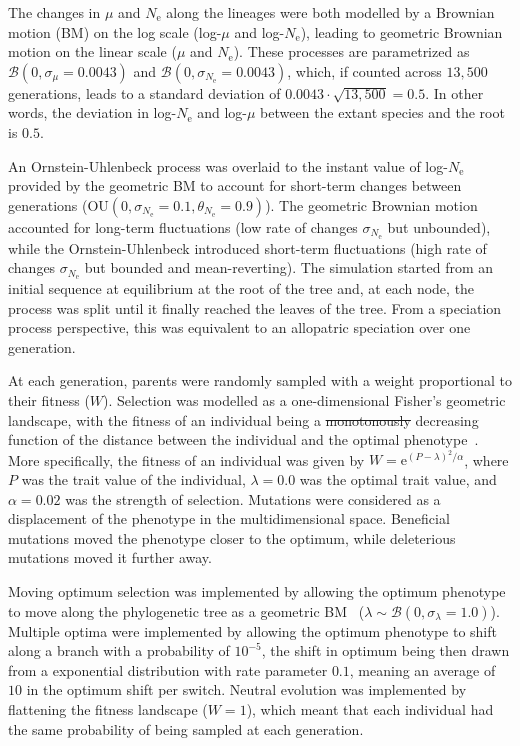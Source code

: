 \documentclass{article}
\makeatletter
\newcommand{\Multiply}{\cdot}
\newcommand{\e}{\text{e}}
\newcommand{\Ne}{N_{\text{e}}}
\newcommand{\Trait}{P}
\newcommand{\MutationRatePheno}{\mu}
\newcommand{\brownian}{\mathcal{B}}
\providecommand{\DIFaddtex}[1]{{\protect\color{blue}\uwave{#1}}} %
\providecommand{\DIFdeltex}[1]{{\protect\color{red}\sout{#1}}} %
\providecommand{\DIFaddbegin}{} %
\providecommand{\DIFaddend}{} %
\providecommand{\DIFdelbegin}{} %
\providecommand{\DIFdelend}{} %
\providecommand{\DIFadd}[1]{\texorpdfstring{\DIFaddtex{#1}}{#1}} %
\providecommand{\DIFdel}[1]{\texorpdfstring{\DIFdeltex{#1}}{}} %
\newcommand{\DIFscaledelfig}{0.5}
\newlength{\DIFdelgraphicswidth} %
\newlength{\DIFdelgraphicsheight} %
\newcommand{\DIFaddincludegraphics}[2][]{{\color{blue}\fbox{\DIFOincludegraphics[#1]{#2}}}} %
\newcommand{\DIFdelincludegraphics}[2][]{%
\sbox{\DIFdelgraphicsbox}{\DIFOincludegraphics[#1]{#2}}%
\settoboxwidth{\DIFdelgraphicswidth}{\DIFdelgraphicsbox} %
\settoboxtotalheight{\DIFdelgraphicsheight}{\DIFdelgraphicsbox} %
\scalebox{\DIFscaledelfig}{%
\parbox[b]{\DIFdelgraphicswidth}{\usebox{\DIFdelgraphicsbox}\\[-\baselineskip] \rule{\DIFdelgraphicswidth}{0em}}\llap{\resizebox{\DIFdelgraphicswidth}{\DIFdelgraphicsheight}{%
\setlength{\unitlength}{\DIFdelgraphicswidth}%
\begin{picture}(1,1)%
\thicklines\linethickness{2pt} %
{\color[rgb]{1,0,0}\put(0,0){\framebox(1,1){}}}%
{\color[rgb]{1,0,0}\put(0,0){\line( 1,1){1}}}%
{\color[rgb]{1,0,0}\put(0,1){\line(1,-1){1}}}%
\end{picture}%
}\hspace*{3pt}}} %
} %
\DeclareRobustCommand{\DIFaddbegin}{\DIFOaddbegin \let\includegraphics\DIFaddincludegraphics} %
\DeclareRobustCommand{\DIFaddend}{\DIFOaddend \let\includegraphics\DIFOincludegraphics} %
\DeclareRobustCommand{\DIFdelbegin}{\DIFOdelbegin \let\includegraphics\DIFdelincludegraphics} %
\DeclareRobustCommand{\DIFdelend}{\DIFOaddend \let\includegraphics\DIFOincludegraphics} %
\let\sout@orig\sout %
\renewcommand{\sout}[1]{\ifmmode\text{\sout@orig{\ensuremath{#1}}}\else\sout@orig{#1}\fi} %
\makeatother
\begin{document}
\DIFaddbegin \newpage
\DIFaddend The changes in $\MutationRatePheno$ and $\Ne$ along the lineages were both modelled by a Brownian motion (BM) on the log scale (log-$\MutationRatePheno$ and log-$\Ne$), leading to geometric Brownian motion on the linear scale ($\MutationRatePheno$ and $\Ne$).
These processes are parametrized as $\brownian \left(0, \sigma_{\MutationRatePheno}=0.0043\right)$ and $\brownian \left(0, \sigma_{\Ne}=0.0043\right)$, which, if counted across $13,500$ generations, leads to a standard deviation of $0.0043 \Multiply \sqrt {13,500} = 0.5$.
In other words, the deviation in log-$\Ne$ and log-$\MutationRatePheno$  between the extant species and the root is $0.5$.
\DIFaddbegin 

\DIFaddend An Ornstein-Uhlenbeck process was overlaid to the instant value of log-$\Ne$ provided by the geometric BM to account for short-term changes between generations ($\text{OU} \left(0, \sigma_{\Ne}=0.1, \theta_{\Ne}=0.9\right)$).
The geometric Brownian motion accounted for long-term fluctuations (low rate of changes $\sigma_{\Ne}$ but unbounded), while the Ornstein-Uhlenbeck introduced short-term fluctuations (high rate of changes $\sigma_{\Ne}$ but bounded and mean-reverting).
The simulation started from an initial sequence at equilibrium at the root of the tree and, at each node, the process was split until it finally reached the leaves of the tree.
From a speciation process perspective, this was equivalent to an allopatric speciation over one generation.

At each generation, parents were randomly sampled with a weight proportional to their fitness ($W$).
Selection was modelled as a one-dimensional Fisher's geometric landscape, with the fitness of an individual being a \DIFdelbegin \DIFdel{monotonously }\DIFdelend \DIFaddbegin \DIFadd{monotonically }\DIFaddend decreasing function of the distance between the individual and the optimal phenotype~\citep{tenaillon_utility_2014,blanquart_epistasis_2016}.
More specifically, the fitness of an individual was given by $W = \e^{(\Trait - \lambda)^2/ \alpha}$, where $\Trait$ was the trait value of the individual, $\lambda=0.0$ was the optimal trait value, and $\alpha=0.02$ was the strength of selection.
Mutations were considered as a displacement of the phenotype in the multidimensional space.
Beneficial mutations moved the phenotype closer to the optimum, while deleterious mutations moved it further away.
\DIFaddbegin 

\DIFaddend Moving optimum selection was implemented by allowing the optimum phenotype to move along the phylogenetic tree as a geometric BM~\citep{hansen_stabilizing_1997} ($\lambda \sim \brownian \left(0, \sigma_{\lambda}=1.0\right)$).
Multiple optima were implemented by allowing the optimum phenotype to shift along a branch with a probability of $10^{-5}$, the shift in optimum being then drawn from a exponential distribution with rate parameter $0.1$, meaning an average of $10$ in the optimum shift per switch.
Neutral evolution was implemented by flattening the fitness landscape ($W=1$), which meant that each individual had the same probability of being sampled at each generation.
\end{document}
